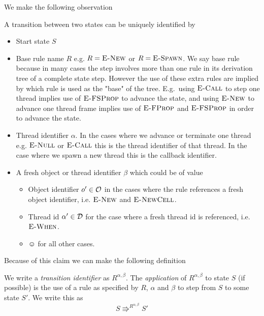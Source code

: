 We make the following observation
\begin{claim}
  A transition between two states can be uniquely identified by
  \begin{itemize}
    \item Start state $S$
    \item Base rule name $R$ e.g. $R = \mbox{{\sc E-New}}$ or $R = \mbox{\sc E-Spawn}$. We say base rule
      because in many cases the step involves more than one rule in its
      derivation tree of a complete state step. However the use of these extra
      rules are implied by which rule is used as the "base" of the tree. E.g.\
      using $\mbox{\sc E-Call}$ to step one thread implies use of $\mbox{\sc E-FSProp}$ to advance the
      state, and using $\mbox{{\sc E-New}}$ to advance one thread frame implies use of
      $\mbox{\sc E-FProp}$ and $\mbox{\sc E-FSProp}$ in order to advance the state.
    \item Thread identifier $\alpha$. In the cases where we advance or terminate
      one thread e.g. $\mbox{{\sc E-Null}}$ or $\mbox{\sc E-Call}$ this is the thread identifier of that
      thread. In the case where we spawn a new thread this is the callback
      identifier.
    \item A fresh object or thread identifier $\beta$ which could be of value
      \begin{itemize}
        \item Object identifier $o' \in \mathcal{O}$ in the cases where the rule
          references a fresh object identifier, i.e. $\mbox{{\sc E-New}}$ and $\mbox{{\sc E-NewCell}}$.
        \item Thread id $\alpha' \in \mathcal{D}$ for the case where a fresh thread id is
          referenced, i.e. $\mbox{{\sc E-When}}$.
        \item $\smiley$ for all other cases.
      \end{itemize}
  \end{itemize}
\end{claim}

Because of this claim we can make the following definition

\begin{definition} \label{def:trans_id}
  We write a \emph{transition identifier} as $R^{\alpha, \beta}$. The
  \emph{application} of $R^{\alpha, \beta}$ to state $S$ (if possible) is the
  use of a rule as specified by $R$, $\alpha$ and $\beta$ to step from $S$ to
  some state $S'$. We write this as
  \begin{equation*}
    S \Rrightarrow^{R^{\alpha, \beta}} S'
  \end{equation*}
\end{definition}

